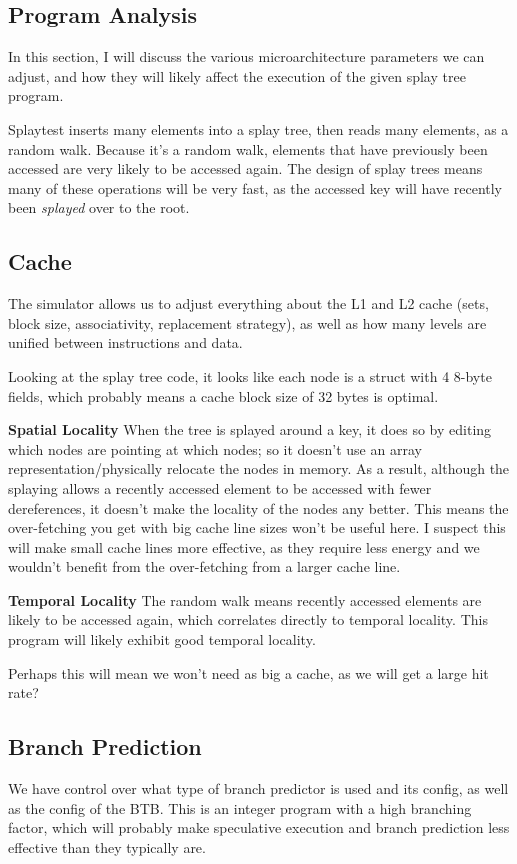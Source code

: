 \documentclass{article}
\begin{document}
\begin{multicols}{2}
  \section{Program Analysis}
  In this section, I will discuss the various microarchitecture parameters we can adjust, and how they will likely affect the execution of the given splay tree program.

  Splaytest inserts many elements into a splay tree, then reads many elements, as a random walk. Because it's a random walk, elements that have previously been accessed are very likely to be accessed again. The design of splay trees means many of these operations will be very fast, as the accessed key will have recently been \textit{splayed} over to the root.

  \subsection{Cache}
  \label{analysis:cache}
  The simulator allows us to adjust everything about the L1 and L2 cache (sets, block size, associativity, replacement strategy), as well as how many levels are unified between instructions and data.

  Looking at the splay tree code, it looks like each node is a struct with 4 8-byte fields, which probably means a cache block size of 32 bytes is optimal.

  \textbf{Spatial Locality} When the tree is splayed around a key, it does so by editing which nodes are pointing at which nodes; so it doesn't use an array representation/physically relocate the nodes in memory. As a result, although the splaying allows a recently accessed element to be accessed with fewer dereferences, it doesn't make the locality of the nodes any better. This means the over-fetching you get with big cache line sizes won't be useful here. I suspect this will make small cache lines more effective, as they require less energy and we wouldn't benefit from the over-fetching from a larger cache line.

  \textbf{Temporal Locality} The random walk means recently accessed elements are likely to be accessed again, which correlates directly to temporal locality. This program will likely exhibit good temporal locality.

  Perhaps this will mean we won't need as big a cache, as we will get a large hit rate?

  \subsection{Branch Prediction}
  We have control over what type of branch predictor is used and its config, as well as the config of the BTB. This is an integer program with a high branching factor, which will probably make speculative execution and branch prediction less effective than they typically are.


\end{multicols}
\end{document}
